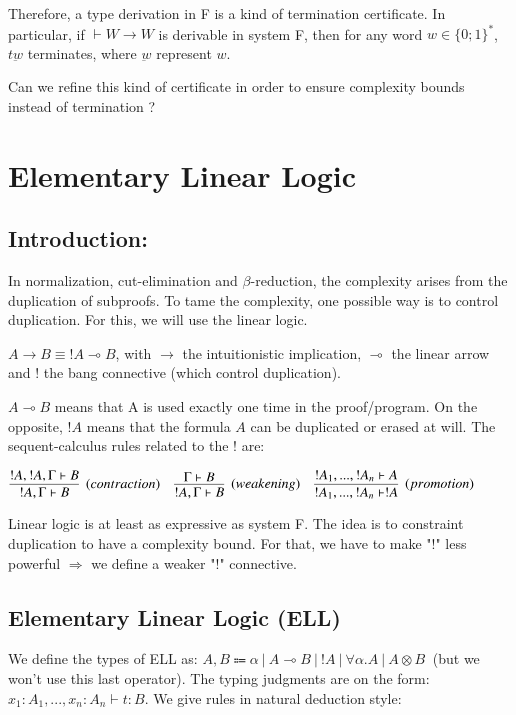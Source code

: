 \documentclass[a4paper,10pt]{article}
\newcommand{\impl}{\rightarrow}	%
\newcommand{\limpl}{\multimap}  %
\begin{document}
\par Therefore, a type derivation in F is a kind of termination certificate. In particular, if $\vdash W \impl W$ is derivable in system F, then for any word $w \in \{0;1\}^{*}$, $t \underbar{w}$ terminates, where $\underbar{w}$ represent $w$.

\par Can we refine this kind of certificate in order to ensure complexity bounds instead of termination ?



\newpage

\section{Elementary Linear Logic}

\subsection{Introduction:}
In normalization, cut-elimination and $\beta$-reduction, the complexity arises from the duplication of subproofs. To tame the complexity, one possible way is to control duplication. For this, we will use the linear logic.

$A \impl B \equiv ! A \limpl B$, with $\impl$ the intuitionistic implication, $\limpl$ the linear arrow and $!$ the bang connective (which control duplication).

$A \limpl B$ means that A is used exactly one time in the proof/program. On the opposite, $!A$ means that the formula $A$ can be duplicated or erased at will. The sequent-calculus rules related to the $!$ are:
\begin{center}
$	\infer[(contraction)]{!A, \Gamma \vdash B}{!A, !A, \Gamma \vdash B} \quad
	\infer[(weakening)]{!A, \Gamma \vdash B}{\Gamma \vdash B} \quad
	\infer[(promotion)]{!A_{1}, ... , !A_{n} \vdash !A }{!A_{1}, ... , !A_{n} \vdash A}
$
\end{center}

 Linear logic is at least as expressive as system F. The idea is to constraint duplication to have a complexity bound. For that, we have to make "$!$" less powerful $\Rightarrow$ we define a weaker "$!$" connective.


\subsection{Elementary Linear Logic (ELL)}
 We define the types of ELL as: $A,B \Coloneqq \alpha \ | \ A \limpl B \ | \ !A \ | \ \forall \alpha.A \ | \ A \otimes B \ $ (but we won't use this last operator). The typing judgments are on the form: $x_1 : A_1, ..., x_n : A_n \vdash t:B$. We give rules in natural deduction style:
\end{document}
